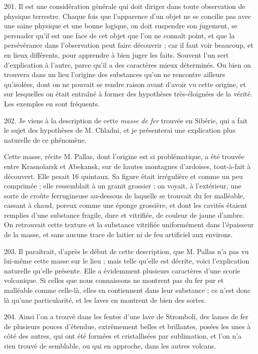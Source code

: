\documentclass[a4paper, 11pt, oneside, polutonikogreek, french]{article}
\begin{document}
201. Il est une considération générale qui doit diriger dans toute observation de physique terrestre. Chaque fois que l'apparence d'un objet ne se concilie pas avec une saine physique et une bonne logique, on doit suspendre son jugement, se persuader qu'il est une face de cet objet que l'on ne connaît point, et que la persévérance dans l'observation peut faire découvrir ; car il faut voir beaucoup, et en lieux différents, pour apprendre à bien juger les faits. Souvent l'un sert d'explication à l'autre, parce qu'il a des caractères mieux déterminés. Ou bien on trouvera dans un lieu l'origine des substances qu'on ne rencontre ailleurs qu'isolées, dont on ne pouvait se rendre raison avant d'avoir vu cette origine, et sur lesquelles on était entraîné à former des hypothèses très-éloignées de la vérité. Les exemples en sont fréquents.

202. Je viens à la description de cette \emph{masse de fer} trouvée en Sibérie, qui a fait le sujet des hypothèses de M. Chladni, et je présenterai une explication plus naturelle de ce phénomène.

\og Cette masse, récite M. Pallas, dont l'origine est si problématique, a été trouvée entre Krasnoïarsk et Abekansk, sur de hautes montagnes d'ardoises, tout-à-fait à découvert. Elle pesait 16 quintaux. Sa figure était irrégulière et comme un peu comprimée ; elle ressemblait à un granit grossier ; on voyait, à l'extérieur, une sorte de croûte ferrugineuse au-dessous de laquelle se trouvait du fer malléable, cassant à chaud, poreux comme une éponge grossière, et dont les cavités étaient remplies d'une substance fragile, dure et vitrifiée, de couleur de jaune d'ambre. On retrouvait cette texture et la substance vitrifiée uniformément dans l'épaisseur de la masse, et sans aucune trace de laitier ni de feu artificiel aux environs. \fg

203. Il paraîtrait, d'après le début de cette description, que M. Pallas n'a pas vu lui-même cette masse sur le lieu ; mais telle qu'elle est décrite, voici l'explication naturelle qu'elle présente. Elle a évidemment plusieurs caractères d'une scorie volcanique. Si celles que nous connaissons ne montrent pas du fer pur et malléable comme celle-là, elles en contiennent dans leur substance ; ce n'est donc là qu'une particularité, et les laves en montrent de bien des sortes.

204. Ainsi l'on a trouvé dans les fentes d'une lave de Stromboli, des lames de fer de plusieurs pouces d'étendue, extrêmement belles et brillantes, posées les unes à côté des autres, qui ont été formées et cristallisées par sublimation, et l'on n'a rien trouvé de semblable, ou qui en approche, dans les autres volcans.
\end{document}
